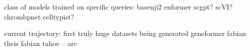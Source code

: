 
class of models trained on specific queries:
basenji2
enformer
scgpt?
scVI?
chrombpnet
celltypist?


current trajectory: first truly huge datasets being generated
geneformer
fabian theis fabian 
tahoe -- arc

